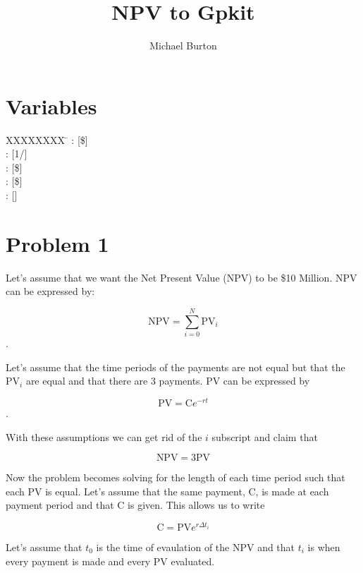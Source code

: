 \documentclass[10pt, a4paper]{article}
\begin{document}
\title{NPV to Gpkit}
\author{Michael Burton}
\maketitle

\section*{Variables}

\begin{tabbing}
  XXXXXXXX \= \kill%
 : [\$]  \\
: [1/]   \\
: [\$]  \\
: [\$]  \\
: [] 
\end{tabbing}

\section*{Problem 1}

Let's assume that we want the Net Present Value (NPV) to be \$10 Million.  NPV can be expressed by:

\[ \text{NPV} = \displaystyle\sum\limits_{i=0}^N \text{PV}_i \] .

Let's assume that the time periods of the payments are not equal but that the PV$_{i}$ are equal and that there are 3 payments.  PV can be expressed by

\[\text{PV} = \text{C} e^{-rt} \].

With these assumptions we can get rid of the $i$ subscript and claim that

\[\text{NPV} = 3\text{PV} \]

Now the problem becomes solving for the length of each time period such that each PV is equal.  Let's assume that the same payment, C, is made at each payment period and that C is given.  This allows us to write 

\[ \text{C}  = \text{PV}e^{r \Delta t_i} \]

Let's assume that $t_0$ is the time of evaulation of the NPV and that $t_i$ is when every payment is made and every PV evaluated. 
\end{document}
